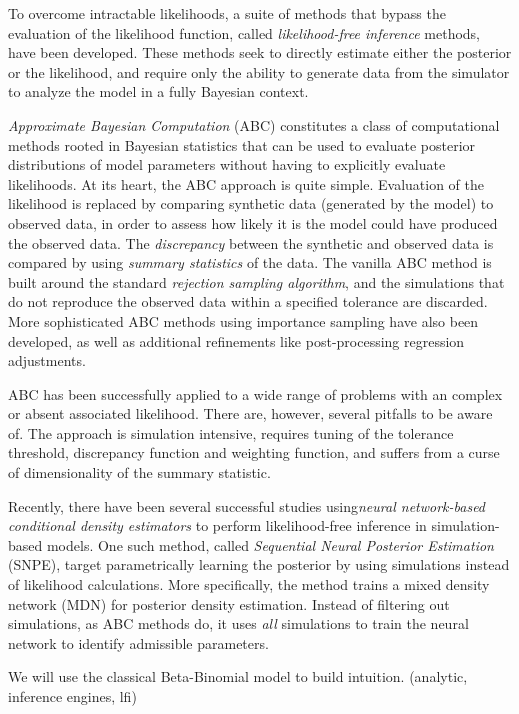 To overcome intractable likelihoods, a suite of methods that bypass the evaluation of the likelihood function, called \textit{likelihood-free inference} methods, have been developed. These methods seek to directly estimate either the posterior or the likelihood, and require only the ability to generate data from the simulator to analyze the model in a fully Bayesian context. 

\textit{Approximate Bayesian Computation} (ABC) constitutes a class of computational methods rooted in Bayesian statistics that can be used to evaluate posterior distributions of model parameters without having to explicitly evaluate likelihoods. At its heart, the ABC approach is quite simple. Evaluation of the likelihood is replaced by comparing synthetic data (generated by the model) to observed data, in order to assess how likely it is the model could have produced the observed data. The \textit{discrepancy} between the synthetic and observed data is compared by using \textit{summary statistics} of the data. The vanilla ABC method is built around the standard \textit{rejection sampling algorithm}, and the simulations that do not reproduce the observed data within a specified tolerance are discarded. More sophisticated ABC methods using importance sampling have also been developed, as well as additional refinements like post-processing regression adjustments. 

ABC has been successfully applied to a wide range of problems with an complex or absent associated likelihood. There are, however, several pitfalls to be aware of. The approach is simulation intensive, requires tuning of the tolerance threshold, discrepancy function and weighting function, and suffers from a curse of dimensionality of the summary statistic.  

Recently, there have been several successful studies using\textit{neural network-based conditional density estimators} to perform likelihood-free inference in simulation-based models. One such method, called \textit{Sequential Neural Posterior Estimation} (SNPE), target parametrically learning the posterior by using simulations instead of likelihood calculations. More specifically, the method trains a mixed density network (MDN) for posterior density estimation. Instead of filtering out simulations, as ABC methods do, it uses \textit{all} simulations to train the neural network to identify admissible parameters. 

We will use the classical Beta-Binomial model to build intuition. (analytic, inference engines, lfi)
 

